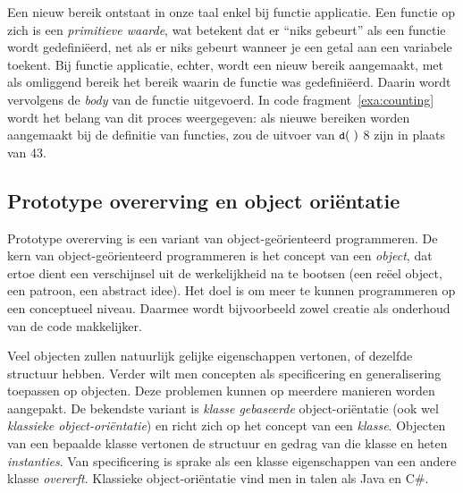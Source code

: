 Een nieuw bereik ontstaat in onze taal enkel bij functie applicatie. Een functie op zich is een \emph{primitieve waarde}, wat betekent dat er ``niks gebeurt'' als een functie wordt gedefiniëerd, net als er niks gebeurt wanneer je een getal aan een variabele toekent. Bij functie applicatie, echter, wordt een nieuw bereik aangemaakt, met als omliggend bereik het bereik waarin de functie was gedefiniëerd. Daarin wordt vervolgens de \emph{body} van de functie uitgevoerd. In code fragment~\ref{exa:counting} wordt het belang van dit proces weergegeven: als nieuwe bereiken worden aangemaakt bij de definitie van functies, zou de uitvoer van $\text{\ttfamily\small\upshape d}(\;)$ 8 zijn in plaats van 43.

\codeFragmentCaption
{}

\subsection{Prototype overerving en object oriëntatie}
\label{sec:taal-prototypen}

Prototype overerving is een variant van object-geörienteerd programmeren. De kern van object-geörienteerd programmeren is het concept van een \emph{object}, dat ertoe dient een verschijnsel uit de werkelijkheid na te bootsen (een reëel object, een patroon, een abstract idee). Het doel is om meer te kunnen programmeren op een conceptueel niveau. Daarmee wordt bijvoorbeeld zowel creatie als onderhoud van de code makkelijker.

Veel objecten zullen natuurlijk gelijke eigenschappen vertonen, of dezelfde structuur hebben. Verder wilt men concepten als specificering en generalisering toepassen op objecten. Deze problemen kunnen op meerdere manieren worden aangepakt. De bekendste variant is \emph{klasse gebaseerde} object-oriëntatie (ook wel \emph{klassieke object-oriëntatie}) en richt zich op het concept van een \emph{klasse}. Objecten van een bepaalde klasse vertonen de structuur en gedrag van die klasse en heten \emph{instanties}. Van specificering is sprake als een klasse eigenschappen van een andere klasse \emph{overerft}. Klassieke object-oriëntatie vind men in talen als Java en C\#.

